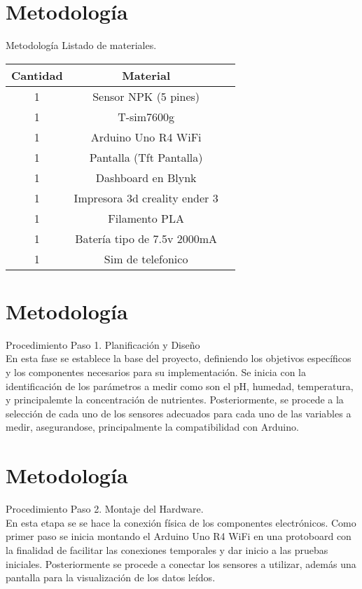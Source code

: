 \documentclass{beamer}
\begin{document}
\section{Metodología}
\begin{frame}{Metodología}
    Listado de materiales.
\begin{longtable}{|c|c|c|}
    \hline
    \textbf{Cantidad} & \textbf{Material}  \\
    \hline
    1 & Sensor NPK (5 pines) \\ 
    \hline
    1 & T-sim7600g  \\
    \hline
    1 & Arduino Uno R4 WiFi  \\
    \hline
    1 & Pantalla (Tft Pantalla)\\
    \hline
    1 & Dashboard en Blynk\\
    \hline
    1 & Impresora 3d creality ender 3\\
    \hline
    1 & Filamento PLA\\
    \hline
    1 &  Batería tipo de 7.5v 2000mA\\   
    \hline
    1 &  Sim de telefonico\\
    \hline

\end{longtable}
\end{frame}

\section{Metodología}
\begin{frame}{Procedimiento}
   {Paso 1. Planificación y Diseño}\\

En esta fase se establece la base del proyecto, definiendo los objetivos específicos y los componentes necesarios para su implementación. Se inicia con la identificación de los parámetros a medir como son el pH, humedad, temperatura, y principalemte la concentración de nutrientes. Posteriormente, se procede a la selección de cada uno de los sensores adecuados para cada uno de las variables a medir, asegurandose, principalmente la compatibilidad con Arduino.\\

\end{frame}

\section{Metodología}
\begin{frame}{Procedimiento}
 {Paso 2. Montaje del Hardware.}\\

En esta etapa se se hace la conexión física de los componentes electrónicos. Como primer paso se inicia montando el Arduino Uno R4 WiFi en una protoboard con la finalidad de facilitar las conexiones temporales y dar inicio a las pruebas iniciales. Posteriormente se procede a conectar los sensores a utilizar, además una pantalla para la visualización de los datos leídos.\\

\end{frame} 
\end{document}
